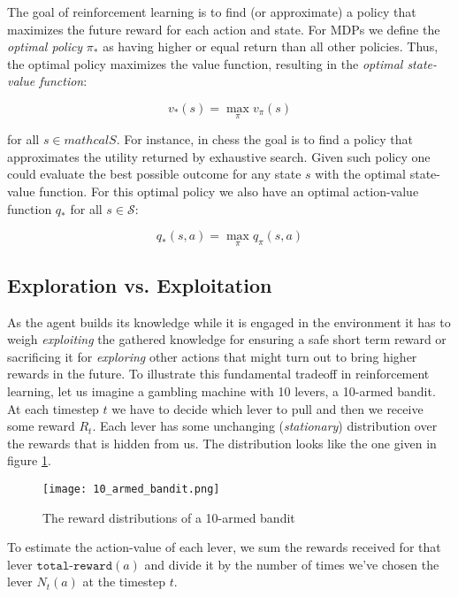 The goal of reinforcement learning is to find (or approximate) a policy that maximizes the future reward for each action and state. For MDPs we define the \textit{optimal policy} $\pi_*$ as having higher or equal return than all other policies. Thus, the optimal policy maximizes the value function, resulting in the \textit{optimal state-value function}:

\begin{equation}
    v_{*}(s) = \max_{\pi} v_{\pi}(s)
\end{equation}

for all $s \in mathcal{S}$. For instance, in chess the goal is to find a policy that approximates the utility returned by exhaustive search. Given such policy one could evaluate the best possible outcome for any state $s$ with the optimal state-value function. For this optimal policy we also have an optimal action-value function $ q_{*} $ for all $ s \in \mathcal{S}$:

\begin{equation}
    q_{*}(s, a) = \max_{\pi}q_{\pi}(s, a)
\end{equation}

\subsection{Exploration vs. Exploitation}
\label{exploration_vs_exploitation}
As the agent builds its knowledge while it is engaged in the environment it has to weigh \textit{exploiting} the gathered knowledge for ensuring a safe short term reward or sacrificing it for \textit{exploring} other actions that might turn out to bring higher rewards in the future. To illustrate this fundamental tradeoff in reinforcement learning, let us imagine a gambling machine with 10 levers, a 10-armed bandit. At each timestep $ t $ we have to decide which lever to pull and then we receive some reward $ R_t $. Each lever has some unchanging (\textit{stationary}) distribution over the rewards that is hidden from us. The distribution looks like the one given in figure \ref{10_armed_bandit}.

\begin{figure}
    \centering
    \texttt{[image: 10\_armed\_bandit.png]}
    \caption{The reward distributions of a 10-armed bandit \cite[p.28]{sutton_reinforcement_2018}}
    \label{10_armed_bandit}
\end{figure}

To estimate the action-value of each lever, we sum the rewards received for that lever $ \texttt{total-reward}(a) $ and divide it by the number of times we've chosen the lever $ N_t(a) $ at the timestep $ t $.

